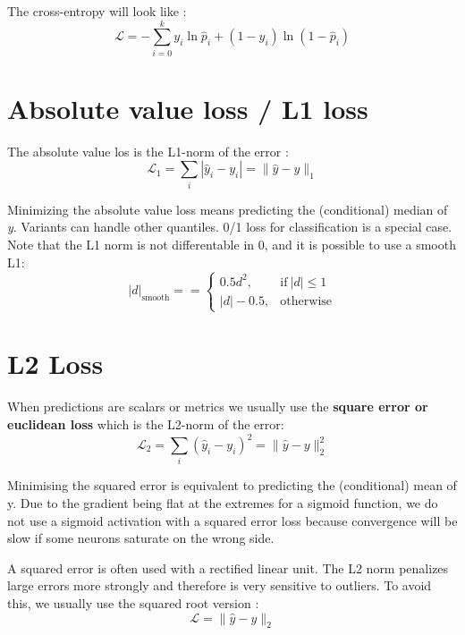 \documentclass{report}
\begin{document}
The cross-entropy will look like :
\[ \mathscr{L} = - \sum_{i=0}^k y_i \ln \hat{p}_i + (1 - y_i) \ln ( 1 - \hat{p}_i ) \]


\section{Absolute value loss / L1 loss}

The absolute value los is the L1-norm of the error :
\[ \mathscr{L}_1 = \sum_i |  \hat{y}_i - y_i | = \| \hat{y} - y \|_1 \]

Minimizing the absolute value loss means predicting the (conditional) median of \textit{y}. Variants can handle other quantiles. 0/1 loss
for classification is a special case.
Note that the L1 norm is not differentable in 0, and it is possible to use a smooth L1:
\[
\lvert{ d } \rvert_{\text{smooth}} ==   \begin{cases}
   0.5 d^2, & \text{if}\ | d  | \leq 1 \\
   | d | - 0.5, & \text{otherwise}
 \end{cases}
\]

\section {L2 Loss }
When predictions are scalars or metrics we usually use the \textbf{square error or euclidean loss} which is the L2-norm of the error:
\[ \mathscr{L}_2 = \sum_i {(  \hat{y}_i - y_i )}^2 = \| \hat{y} - y \|_2^2 \]

Minimising the squared error is equivalent to predicting the (conditional) mean of y. Due to the gradient being flat at the extremes for
a sigmoid function, we do not use a sigmoid activation with a squared error loss because convergence will be slow if some neurons saturate
on the wrong side.

A squared error is often used with a rectified linear unit. The L2 norm penalizes large errors more strongly and therefore is very sensitive to outliers. To avoid this, we usually use the squared root version :
\[ \mathscr{L} = \| \hat{y} - y \|_2 \]
\end{document}
